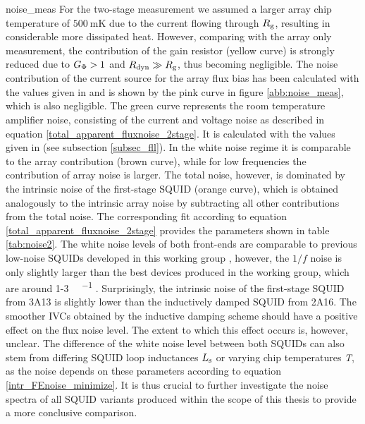 {noise_meas}
For the two-stage measurement we assumed a larger array chip temperature of $\qty{500}{\milli\kelvin}$ due to the current flowing through $R_{\rm g}$, resulting in considerable more dissipated heat. However, comparing with the array only measurement, the contribution of the gain resistor (yellow curve) is strongly reduced due to $G_{\rm \Phi}>1$ and $R_{\rm dyn}\gg R_{\rm g}$, thus becoming negligible. The noise contribution of the current source for the array flux bias has been calculated with the values given in \cite{Kaap2020} and is shown by the pink curve in figure \ref{abb:noise_meas}, which is also negligible. The green curve represents the room temperature amplifier noise, consisting of the current and voltage noise as described in equation \ref{total_apparent_fluxnoise_2stage}. It is calculated with the values given in \cite{Drung2006} (see subsection \ref{subsec_fll}). In the white noise regime it is comparable to the array contribution (brown curve), while for low frequencies the contribution of array noise is larger. The total noise, however, is dominated by the intrinsic noise of the first-stage SQUID (orange curve), which is obtained analogously to the intrinsic array noise by subtracting all other contributions from the total noise. The corresponding fit according to equation \ref{total_apparent_fluxnoise_2stage} provides the parameters shown in table \ref{tab:noise2}. 
The white noise levels of both front-ends are comparable to previous low-noise SQUIDs developed in this working group \cite{Ferring2015}, however, the $1/f$ noise is only slightly larger than the best devices produced in the working group, which are around 1-3 \unit{\micro\fq\per\sqrthz} \cite{Kempf2016}. Surprisingly, the intrinsic noise of the first-stage SQUID from 3A13 is slightly lower than the inductively damped SQUID from 2A16. The smoother IVCs obtained by the inductive damping scheme should have a positive effect on the flux noise level. The extent to which this effect occurs is, however, unclear. The difference of the white noise level between both SQUIDs can also stem from differing SQUID loop inductances $L_{\rm s}$ or varying chip temperatures \textit{T}, as the noise depends on these parameters according to equation \ref{intr_FEnoise_minimize}. It is thus crucial to further investigate the noise spectra of all SQUID variants produced within the scope of this thesis to provide a more conclusive comparison.

